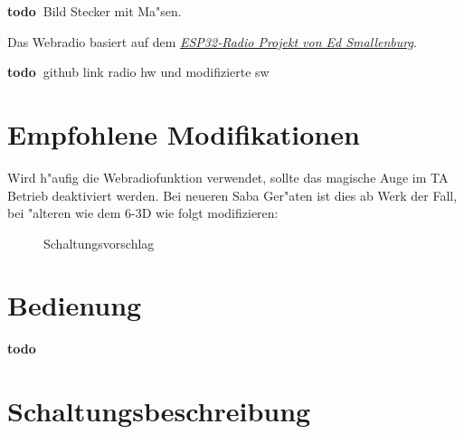 \documentclass[ngerman,11pt,parskip=half] {scrartcl}
\newcommand {\todo} {\textbf{\color{red} todo\ }}
\begin{document}
\todo Bild Stecker mit Ma"sen.

Das Webradio basiert auf dem \emph{\href{https://github.com/Edzelf/ESP32-Radio}{ESP32-Radio Projekt von Ed Smallenburg}}.

\todo github link radio hw und modifizierte sw


\section{Empfohlene Modifikationen} \label{sec:mod}

Wird h"aufig die Webradiofunktion verwendet, sollte das magische Auge im TA Betrieb deaktiviert werden. Bei neueren Saba Ger"aten ist dies ab Werk der Fall, bei "alteren wie dem 6-3D wie folgt modifizieren:

\begin{figure}[H]
\centering
{}
\caption{Schaltungsvorschlag } \label{fig:st}
\end{figure}

\section{Bedienung} \label{sec:bedienung}

\todo

\section{Schaltungsbeschreibung} \label{sec:schaltung}
\end{document}
